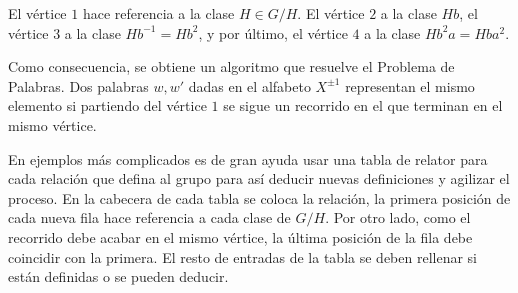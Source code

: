 \begin{enumerate}
\begin{center}
\end{center}
\end{enumerate}

El vértice $1$ hace referencia a la clase $H \in G/H$. El vértice $2$ a la clase $Hb$, el vértice $3$ a la clase $Hb^{-1}=Hb^2$, y por último, el vértice $4$ a la clase $Hb^2a=Hba^2$.


Como consecuencia, se obtiene un algoritmo que resuelve el Problema de Palabras. Dos palabras $w, w'$ dadas en el alfabeto $X^{\pm 1}$ representan el mismo elemento si partiendo del vértice $1$ se sigue un recorrido en el que terminan en el mismo vértice. 


En ejemplos más complicados es de gran ayuda  usar una tabla de relator para cada relación que defina al grupo para así deducir nuevas definiciones y agilizar el proceso.   En la cabecera de cada tabla se coloca la relación, la primera posición de cada nueva fila hace referencia a cada clase de $G/H$. Por otro lado, como el recorrido debe acabar en el mismo vértice, la última posición de la fila debe coincidir con la primera. El resto de entradas de la tabla se deben rellenar si están definidas o se pueden deducir.


